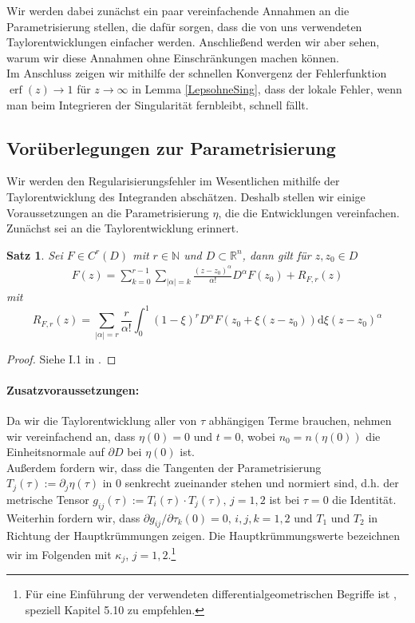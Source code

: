 \documentclass[12pt,a4paper]{scrartcl}
\newtheorem{Satz}{Satz}[section]
\newcommand{\dd}{\mathrm{d}}
\numberwithin{equation}{section}
\newcommand{\R}{\mathbb{R}} %
\newcommand{\N}{\mathbb{N}} %
\newcommand{\erf}{\operatorname{erf}}
\begin{document}
Wir werden dabei zunächst ein paar vereinfachende Annahmen an die Parametrisierung stellen, die dafür sorgen, dass die von uns verwendeten Taylorentwicklungen einfacher werden. Anschließend werden wir aber sehen, warum wir diese Annahmen ohne Einschränkungen machen können. \\
Im Anschluss zeigen wir mithilfe der schnellen Konvergenz der Fehlerfunktion $\erf(z) \to 1$ für $z \to \infty$ in Lemma \ref{LepsohneSing}, dass der lokale Fehler, wenn man beim Integrieren der Singularität fernbleibt, schnell fällt. 


\subsection{Vorüberlegungen zur Parametrisierung} \label{ParametrisierungVoraussetzungen}
Wir werden den Regularisierungsfehler im Wesentlichen mithilfe der Taylorentwicklung des Integranden abschätzen. Deshalb stellen wir einige Voraussetzungen an die Parametrisierung $\eta$, die die Entwicklungen vereinfachen. Zunächst sei an die Taylorentwicklung erinnert.

\begin{Satz} \label{STaylor}
Sei $F\in C^r(D)$ mit $r\in \N$ und $D \subset \R^n$, dann gilt für $z,z_0 \in D$
\begin{align}
F(z) = \sum_{k=0}^{r-1} \sum_{|\alpha|=k} \frac{(z-z_0)^\alpha}{\alpha!}D^\alpha F(z_0) + R_{F,r}(z)
\end{align}
mit 
\[
 R_{F,r}(z) = \sum_{|\alpha|=r}\frac{r}{\alpha!}\int_0^1 (1-\xi)^r D^\alpha F(z_0 + \xi(z-z_0)) \dd \xi(z-z_0)^\alpha
\]
\end{Satz}  
\begin{proof}
Siehe I.1 in \cite{Grafakos}.
\end{proof}
\paragraph{Zusatzvoraussetzungen:} 
Da wir die Taylorentwicklung aller von $\tau$ abhängigen Terme brauchen, nehmen wir vereinfachend an, dass $\eta(0)=0$ und $t=0$, wobei $n_0=n(\eta(0))$ die Einheitsnormale auf $\partial D$ bei $\eta(0)$ ist. 
\\
Außerdem fordern wir, dass die Tangenten der Parametrisierung $T_j(\tau):=\partial_j \eta(\tau)$ in $0$ senkrecht zueinander stehen und normiert sind, d.h. der metrische Tensor $g_{ij}(\tau) := T_i(\tau) \cdot T_j(\tau),\, j=1,2$ ist bei $\tau=0$ die Identität. Weiterhin fordern wir, dass $\partial g_{ij}/\partial \tau_k (0)=0, \, i,j,k=1,2$ und $T_1$ und $T_2$ in Richtung der Hauptkrümmungen zeigen. Die Hauptkrümmungswerte bezeichnen wir im  Folgenden mit $\kappa_j$, $j=1,2$.\footnote{Für eine Einführung der verwendeten differentialgeometrischen Begriffe ist \cite{Borceux}, speziell Kapitel 5.10 zu empfehlen.}
\end{document}
